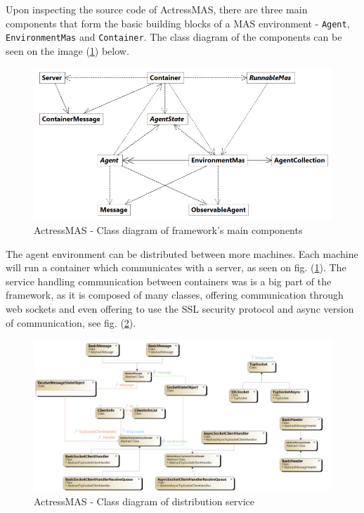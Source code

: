 \documentclass[main.tex]{subfiles}
\begin{document}
Upon inspecting the source code of ActressMAS, there are three main components that form the basic building 
blocks of a MAS environment - \texttt{Agent}, \texttt{EnvironmentMas} and \texttt{Container}.
The class diagram of the components can be seen on the image (\ref{actress-env}) below.

\begin{figure}[htbp]
    \centering
    \includegraphics[width=.9\textwidth]{actress-environment2.png}
    \caption{ActressMAS - Class diagram of framework's main components}
    \label{actress-env}
\end{figure}

The agent environment can be distributed between more machines. Each machine will run a container which communicates with a 
server, as seen on fig. (\ref{actress-env}). The service handling communication between containers was is a big part of the 
framework, as it is composed of many classes, offering communication through web sockets and even offering to 
use the SSL security protocol and async version of communication, see fig. (\ref{actress-distr}).

\begin{figure}[htbp]
    \centering
    \includegraphics[width=.9\textwidth]{ClassDiagram-actress-containers.png}
    \caption{ActressMAS - Class diagram of distribution service}
    \label{actress-distr}
\end{figure}
\end{document}
